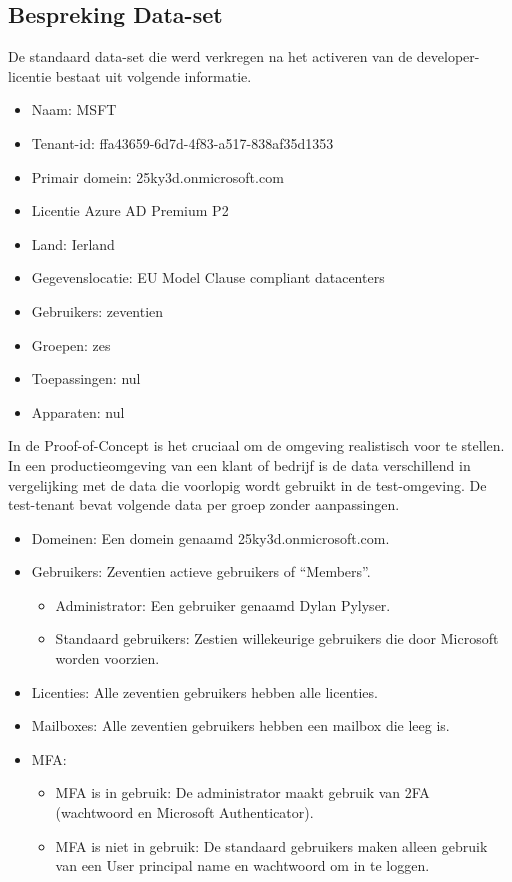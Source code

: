 \subsection{Bespreking Data-set}

De standaard data-set die werd verkregen na het activeren van de developer-licentie bestaat uit volgende informatie.

\begin{itemize}
    \item Naam: MSFT
    \item Tenant-id: ffa43659-6d7d-4f83-a517-838af35d1353
    \item Primair domein: 25ky3d.onmicrosoft.com
    \item Licentie Azure AD Premium P2
    \item Land: Ierland
    \item Gegevenslocatie: EU Model Clause compliant datacenters
    \item Gebruikers: zeventien
    \item Groepen: zes
    \item Toepassingen: nul
    \item Apparaten: nul
\end{itemize}

In de Proof-of-Concept is het cruciaal om de omgeving realistisch voor te stellen. In een productieomgeving van een klant of bedrijf is de data verschillend in vergelijking met de data die voorlopig wordt gebruikt in de test-omgeving. De test-tenant bevat volgende data per groep zonder aanpassingen.

\begin{itemize}
    \item Domeinen: Een domein genaamd 25ky3d.onmicrosoft.com.
    \item Gebruikers: Zeventien actieve gebruikers of “Members”.
    \begin{itemize}
        \item Administrator: Een gebruiker genaamd Dylan Pylyser.
        \item Standaard gebruikers: Zestien willekeurige gebruikers die door Microsoft worden voorzien.
    \end{itemize}
    \item Licenties: Alle zeventien gebruikers hebben alle licenties.
    \item Mailboxes: Alle zeventien gebruikers hebben een mailbox die leeg is.
    \item \Ac{MFA}: 
        \begin{itemize}
            \item \ac{MFA} is in gebruik: De administrator maakt gebruik van \ac{2FA} (wachtwoord en Microsoft Authenticator).
            \item \Ac{MFA} is niet in gebruik: De standaard gebruikers maken alleen gebruik van een User principal name en wachtwoord om in te loggen.
        \end{itemize}
\end{itemize}

